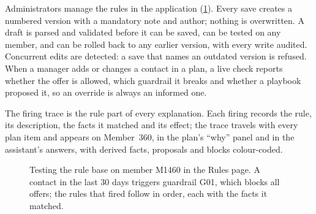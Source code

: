 Administrators manage the rules in the application (\cref{fig:rulestrace}). Every save creates a numbered version with a mandatory note and author; nothing is overwritten. A draft is parsed and validated before it can be saved, can be tested on any member, and can be rolled back to any earlier version, with every write audited. Concurrent edits are detected: a save that names an outdated version is refused. When a manager adds or changes a contact in a plan, a live check reports whether the offer is allowed, which guardrail it breaks and whether a playbook proposed it, so an override is always an informed one.

The firing trace is the rule part of every explanation. Each firing records the rule, its description, the facts it matched and its effect; the trace travels with every plan item and appears on Member~360, in the plan's \enquote{why} panel and in the assistant's answers, with derived facts, proposals and blocks colour-coded.

\begin{figure}[tb]
  \centering
  \caption{Testing the rule base on member M1460 in the Rules page. A contact in the last 30 days triggers guardrail G01, which blocks all offers; the rules that fired follow in order, each with the facts it matched.}
  \label{fig:rulestrace}
\end{figure}
